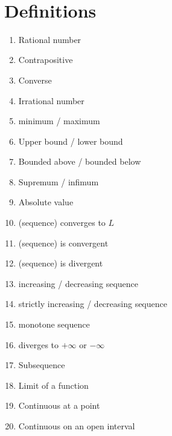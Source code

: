 \documentclass[12pt]{amsart}
\begin{document}

\

\section*{Definitions}

\begin{enumerate}
	\item Rational number
	\item Contrapositive
	\item Converse
	\item Irrational number
	\item minimum / maximum
	\item Upper bound / lower bound
	\item Bounded above / bounded below
	\item Supremum / infimum

	\item Absolute value
	\item (sequence) converges to $L$

	\item (sequence) is convergent
	\item (sequence) is divergent

	\item increasing / decreasing sequence
	\item strictly increasing / decreasing sequence
	\item monotone sequence
	\item diverges to $+\infty$ or $-\infty$		
					
	\item Subsequence
	



	\item Limit of a function

	\item Continuous at a point
	\item Continuous on an open interval
	\begin{comment}
	\item Continuous on a closed interval
	
	\item Differentiable
	\item Derivative (at a point)
	\item Derivative (function)
		\item Increasing/decreasing function
\end{comment}
\end{enumerate}
\end{document}
